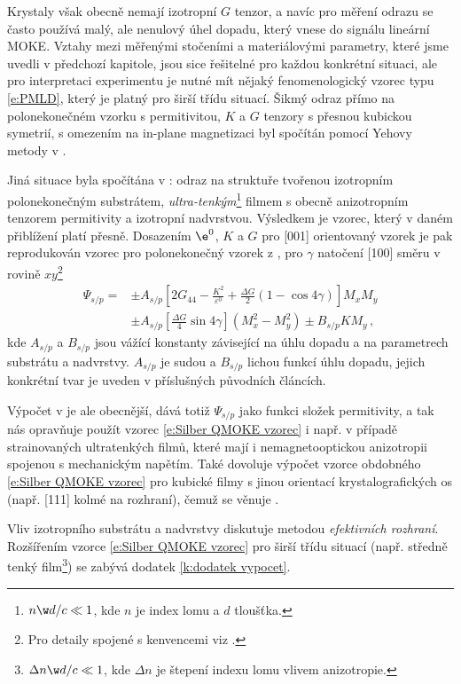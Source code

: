 Krystaly však obecně nemají izotropní $G$ tenzor, a navíc pro měření odrazu se často používá malý, ale nenulový úhel dopadu, který vnese do signálu lineární MOKE.
Vztahy mezi měřenými stočeními a materiálovými parametry, které jsme uvedli v předchozí kapitole, jsou sice řešitelné pro každou konkrétní situaci, ale pro interpretaci experimentu je nutné mít nějaký fenomenologický vzorec typu \eqref{e:PMLD}, který je platný pro širší třídu situací.
Šikmý odraz přímo na polonekonečném vzorku s permitivitou, $K$ a $G$ tenzory s přesnou kubickou symetrií, s omezením na in-plane magnetizaci byl spočítán pomocí Yehovy metody v \cite{osmismerna}.

Jiná situace byla spočítána v \cite{VISMOKE}: odraz na struktuře tvořenou izotropním polonekonečným substrátem, \emph{ultra-tenkým}\footnote{$n\w d/c\ll 1$, kde $n$ je index lomu a $d$ tloušťka.} filmem s obecně anizotropním tenzorem permitivity a izotropní nadvrstvou.
Výsledkem je vzorec, který v daném přiblížení platí přesně.
Dosazením $\e^0$, $K$ a $G$ pro [001] orientovaný vzorek je pak reprodukován vzorec pro polonekonečný vzorek z \cite{osmismerna}, pro  $\gamma$ natočení [100] směru v rovině $xy$\footnote{Pro detaily spojené s kenvencemi viz \cite{Silber}.}
\begin{align} \label{e:Silber QMOKE vzorec}
\Psi_{s/p}=&\pm A_{s/p} \left[ 2G_{44}-\frac{K^2}{\varepsilon^0}+\frac{\Delta G}{2}(1-\cos 4\gamma)  \right] M_x M_y\\
& \pm A_{s/p} \left[ \frac{\Delta G}{4}\sin 4\gamma  \right] \left(M_x^2-M_y^2\right) \pm B_{s/p} K M_y \,,
\end{align}
kde $A_{s/p}$ a $B_{s/p}$ jsou vážící konstanty závisející na úhlu dopadu a na parametrech substrátu a nadvrstvy. $A_{s/p}$ je sudou a $B_{s/p}$ lichou funkcí úhlu dopadu, jejich konkrétní tvar je uveden v příslušných původních článcích.

Výpočet v \cite{VISMOKE} je ale obecnější, dává totiž $\Psi_{s/p}$ jako funkci složek permitivity, a tak nás opravňuje použít vzorec \eqref{e:Silber QMOKE vzorec} i např. v případě strainovaných ultratenkých filmů, které mají i nemagnetooptickou anizotropii spojenou s mechanickým napětím.
Také dovoluje výpočet vzorce obdobného \eqref{e:Silber QMOKE vzorec} pro kubické filmy s jinou orientací krystalografických os (např. [111] kolmé na rozhraní), čemuž se věnuje \cite{Silber}.

Vliv izotropního substrátu a nadvrstvy diskutuje \cite{Vispolar} metodou \emph{efektivních rozhraní}. Rozšířením vzorce \eqref{e:Silber QMOKE vzorec} pro širší třídu situací (např. středně tenký film\footnote{$\Delta n\w d/c\ll 1$, kde $\Delta n$ je štepení indexu lomu vlivem anizotropie.}) se zabývá dodatek \ref{k:dodatek vypocet}.

